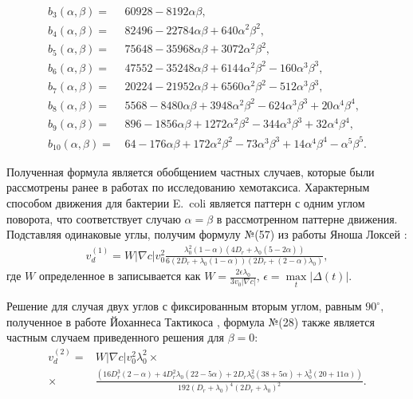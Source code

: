 \begin{equation}
\begin{aligned}
	b_3(\alpha, \beta) =&\, 60928 - 8192\alpha\beta, \\
	b_4(\alpha, \beta) =&\, 82496 - 22784\alpha\beta + 640\alpha^2\beta^2, \\
	b_5(\alpha, \beta) =&\, 75648 - 35968\alpha\beta + 3072\alpha^2\beta^2, \\
	b_6(\alpha, \beta) =&\, 47552 - 35248\alpha\beta + 6144\alpha^2\beta^2 - 160\alpha^3\beta^3, \\
	b_7(\alpha, \beta) =&\, 20224 - 21952\alpha\beta + 6560\alpha^2\beta^2 - 512\alpha^3\beta^3, \\
	b_8(\alpha, \beta) =&\, 5568 - 8480\alpha\beta + 3948\alpha^2\beta^2 - 624\alpha^3\beta^3 + 20\alpha^4\beta^4, \\
	b_9(\alpha, \beta) =&\, 896 - 1856\alpha\beta + 1272\alpha^2\beta^2 - 344\alpha^3\beta^3 + 32\alpha^4\beta^4, \\
	b_{10}(\alpha, \beta) =&\, 64 - 176\alpha\beta + 172\alpha^2\beta^2 - 73\alpha^3\beta^3 + 14\alpha^4\beta^4 - \alpha^5 \beta^5.
\end{aligned}
\end{equation}

Полученная формула является обобщением частных случаев, которые были рассмотрены ранее в работах по исследованию хемотаксиса. Характерным способом движения для бактерии E.~coli является паттерн с одним углом поворота, что соответствует случаю $\alpha=\beta$ в рассмотренном паттерне движения. Подставляя одинаковые углы, получим формулу №(57) из работы Яноша Локсей \cite{locsei_persistence_2007}:
\begin{equation}
    \begin{aligned}
        v_d^{(1)} = W|\nabla c|v_0^2\frac{\lambda_0^2(1-\alpha)\left (4D_r+\lambda_0(5-2\alpha) \right )}{6\left (2D_r+\lambda_0(1-\alpha) \right ) \left (2D_r+(2-\alpha)\lambda_0 \right )},
    \end{aligned}
\end{equation}
где $W$ определенное в \cite{locsei_persistence_2007} записывается как $W=\frac{2\epsilon\lambda_0}{3v_0|\nabla c|}$, $\epsilon=\max\limits_t|\Delta(t)|$.

Решение для случая двух углов с фиксированным вторым углом, равным $90^\circ$, полученное в работе Йоханнеса Тактикоса \cite{taktikos_how_2013}, формула №(28) также является частным случаем приведенного решения для $\beta=0$:
\begin{equation}
    \begin{aligned}
        v_d^{(2)} =& W |\nabla c| v_0^2 \lambda_0^2 \times \\
		\times& \frac{\left (16D_r^3(2-\alpha) + 4D_r^2\lambda_0(22-5\alpha) + 2D_r\lambda_0^2(38+5\alpha) + \lambda_0^3(20+11\alpha) \right )}{192(D_r+\lambda_0)^4(2D_r+\lambda_0)^2}.
    \end{aligned}
\end{equation}

